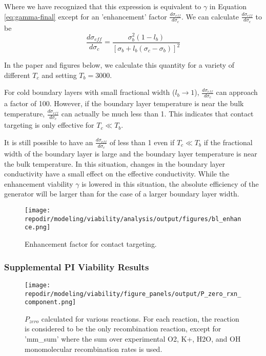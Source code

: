 Where we have recognized that this expression is equivalent to $\gamma$  in Equation \ref{eq:gamma-final} except for an 'enhancement' factor $\frac{d\sigma_{eff}}{d\sigma_{c}}$. We can calculate $\frac{d\sigma_{eff}}{d\sigma_{c}}$ to be
\[
\frac{d\sigma_{eff}}{d\sigma_{c}}=\frac{\sigma_{b}^2 (1-l_{b})}{[\sigma_{b}+l_{b} (\sigma_{c}-\sigma_{b})]^2} \tag{14}
\]


In the paper and figures below, we calculate this quantity for a variety of different $T_{c}$ and setting $T_{b} = 3000$.

For cold boundary layers with small fractional width ($l_{b}\rightarrow1$), $\frac{d\sigma_{eff}}{d\sigma_{c}}$ can approach a factor of 100. However, if the boundary layer temperature is near the bulk temperature, $\frac{d\sigma_{eff}}{d\sigma_{c}}$ can actually be much less than 1. This indicates that contact targeting is only effective for $T_{c} \ll T_{b}$. 

It is still possible to have an $\frac{d\sigma_{eff}}{d\sigma_{c}}$ of less than 1 even if $T_{c} \ll T_{b}$ if the fractional width of the boundary layer is large and the  boundary layer temperature is near the bulk temperature. In this situation, changes in the boundary layer conductivity have a small effect on the effective conductivity. While the enhancement viability $\gamma$ is lowered in this situation, the absolute efficiency of the generator will be larger than for the case of a larger boundary layer width.



\begin{figure}[h]
    \texttt{[image: \\repodir/modeling/viability/analysis/output/figures/bl\_enhance.png]} 
    \caption{Enhancement factor for contact targeting.}
    \label{fig:SI_bl_enhance}
\end{figure}

\clearpage

\subsubsection{Supplemental PI Viability Results}

\begin{figure}[h]
    \centering
    \texttt{[image: \\repodir/modeling/viability/figure\_panels/output/P\_zero\_rxn\_component.png]} 
    \caption{$P_{zero}$ calculated for various reactions. For each reaction, the reaction is considered to be the only recombination reaction, except for 'mm\_sum' where the sum over experimental O2, K+, H2O, and OH monomolecular recombination rates is used.}
    \label{fig:SI_P_zero_rxn_component}
\end{figure}


